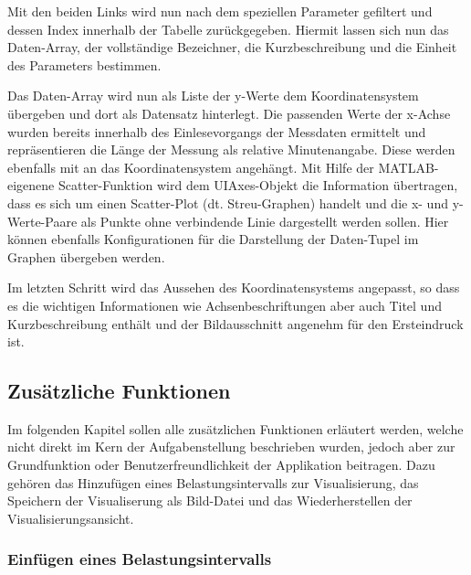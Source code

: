 

Mit den beiden Links wird nun nach dem speziellen Parameter gefiltert und dessen Index innerhalb der Tabelle zurückgegeben. Hiermit lassen sich nun das Daten-Array, der vollständige Bezeichner, die Kurzbeschreibung und die Einheit des Parameters bestimmen. 



Das Daten-Array wird nun als Liste der y-Werte dem Koordinatensystem übergeben und dort als Datensatz hinterlegt. Die passenden Werte der x-Achse wurden bereits innerhalb des Einlesevorgangs der Messdaten ermittelt und repräsentieren die Länge der Messung als relative Minutenangabe. Diese werden ebenfalls mit an das Koordinatensystem angehängt. Mit Hilfe der MATLAB-eigenene Scatter-Funktion wird dem UIAxes-Objekt die Information übertragen, dass es sich um einen Scatter-Plot (dt. Streu-Graphen) handelt und die x- und y-Werte-Paare als Punkte ohne verbindende Linie dargestellt werden sollen. Hier können ebenfalls Konfigurationen für die Darstellung der Daten-Tupel im Graphen übergeben werden.



Im letzten Schritt wird das Aussehen des Koordinatensystems angepasst, so dass es die wichtigen Informationen wie Achsenbeschriftungen aber auch Titel und Kurzbeschreibung enthält und der Bildausschnitt angenehm für den Ersteindruck ist.

\subsection{Zusätzliche Funktionen}

Im folgenden Kapitel sollen alle zusätzlichen Funktionen erläutert werden, welche nicht direkt im Kern der Aufgabenstellung beschrieben wurden, jedoch aber zur Grundfunktion oder Benutzerfreundlichkeit der Applikation beitragen. Dazu gehören das Hinzufügen eines Belastungsintervalls zur Visualisierung, das Speichern der Visualiserung als Bild-Datei und das Wiederherstellen der Visualisierungsansicht.

\subsubsection{Einfügen eines Belastungsintervalls}

